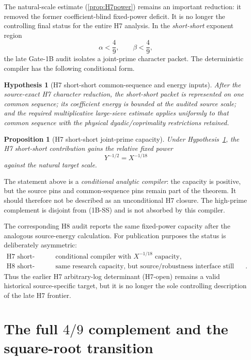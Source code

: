 \documentclass[11pt]{article}
\newtheorem{proposition}[theorem]{Proposition}
\newtheorem{hypothesis}[theorem]{Hypothesis}
\theoremstyle{definition}
\theoremstyle{remark}
\newcommand{\1}{\mathbf 1}
\begin{document}
The natural-scale estimate (\ref{prop:H7power}) remains an important reduction: it removed the former
coefficient-blind fixed-power deficit.  It is no longer the controlling final status for the entire H7 analysis.
In the \emph{short-short} exponent region
\[
 \boxed{\alpha<\frac49,\qquad \beta<\frac49,}
\tag{1B-SS}
\]
the late Gate-1B audit isolates a joint-prime character packet.  The deterministic compiler has the following
conditional form.

\begin{hypothesis}[H7 short-short common-sequence and energy inputs]\label{hyp:H7SS}
After the source-exact H7 character reduction, the short-short packet is represented on one common sequence;
its coefficient energy is bounded at the audited source scale; and the required multiplicative large-sieve
estimate applies uniformly to that common sequence with the physical dyadic/coprimality restrictions retained.
\end{hypothesis}

\begin{proposition}[H7 short-short joint-prime capacity]\label{prop:H7SS}
Under Hypothesis~\ref{hyp:H7SS}, the H7 short-short contribution gains the relative fixed power
\[
 \boxed{Y^{-1/2}=X^{-1/18}}
\tag{1B-H7SS}
\]
against the natural target scale.
\end{proposition}

The statement above is a \emph{conditional analytic compiler}: the capacity is positive, but the source pins and common-sequence pins remain part of the theorem.  It should therefore not be described as an unconditional H7 closure.
The high-prime complement is disjoint from (1B-SS) and is not absorbed by this compiler.

The corresponding H8 audit reports the same fixed-power capacity after the analogous source-energy calculation.
For publication purposes the status is deliberately asymmetric:
\[
 \boxed{\begin{array}{ll}
 \text{H7 short-short:}&\text{conditional compiler with }X^{-1/18}\text{ capacity},\\
 \text{H8 short-short:}&\text{same research capacity, but source/robustness interface still open}.
 \end{array}}
\tag{1B-H78-status}
\]
Thus the earlier H7 arbitrary-log determinant (H7-open) remains a valid historical source-specific target, but it
is no longer the sole controlling description of the late H7 frontier.

\section{The full $4/9$ complement and the square-root transition}
\label{sec:g1b-49-complement}
\end{document}
